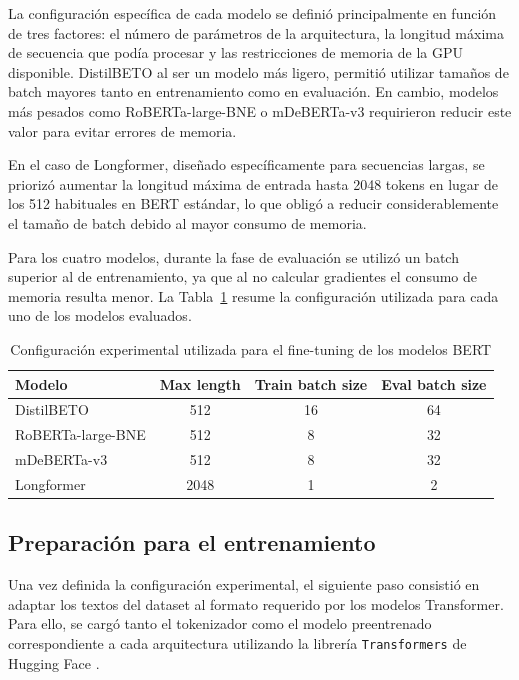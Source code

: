 La configuración específica de cada modelo se definió principalmente en función de tres factores: el número de parámetros de la arquitectura, la longitud máxima de secuencia que podía procesar y las restricciones de memoria de la \ac{GPU} disponible. \ac{DistilBETO} al ser un modelo más ligero, permitió utilizar tamaños de batch mayores tanto en entrenamiento como en evaluación. En cambio, modelos más pesados como RoBERTa-large-BNE o mDeBERTa-v3 requirieron reducir este valor para evitar errores de memoria.

En el caso de Longformer, diseñado específicamente para secuencias largas, se priorizó aumentar la longitud máxima de entrada hasta 2048 tokens en lugar de los 512 habituales en \ac{BERT} estándar, lo que obligó a reducir considerablemente el tamaño de batch debido al mayor consumo de memoria. 

Para los cuatro modelos, durante la fase de evaluación se utilizó un batch superior al de entrenamiento, ya que al no calcular gradientes el consumo de memoria resulta menor. La Tabla~\ref{tab:bert_training_config} resume la configuración utilizada para cada uno de los modelos evaluados.

\begin{table}[H]
	\centering
	\caption{Configuración experimental utilizada para el fine-tuning de los modelos BERT}
	\label{tab:bert_training_config}
	\begin{tabular}{|l|c|c|c|}
		\hline
		\textbf{Modelo} & \textbf{Max length} & \textbf{Train batch size} & \textbf{Eval batch size} \\
		\hline
		DistilBETO & 512 & 16 & 64 \\
		RoBERTa-large-BNE & 512 & 8 & 32 \\
		mDeBERTa-v3 & 512 & 8 & 32 \\
		Longformer & 2048 & 1 & 2 \\
		\hline
	\end{tabular}
\end{table}

\subsection{Preparación para el entrenamiento}

Una vez definida la configuración experimental, el siguiente paso consistió en adaptar los textos del dataset al formato requerido por los modelos Transformer. Para ello, se cargó tanto el tokenizador como el modelo preentrenado correspondiente a cada arquitectura utilizando la librería \texttt{Transformers} de Hugging Face \cite{wolf_transformers_2020}.

